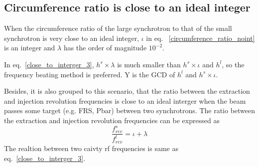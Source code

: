 \subsection{Circumference ratio is close to an ideal integer}
When the circumference ratio of the large synchrotron to that of the small synchrotron is very close to an ideal integer, $\iota$ in eq. ~\ref{circumference_ratio_noint} is an integer and $\lambda$ has the order of magnitude $10^{-2}$.


In eq.~\ref{close_to_interger_3}, $h^s\times\lambda $ is much smaller than $h^s \times \iota$ and $h^l$, so the frequency beating method is preferred. Y is the GCD of $h^l$ and $h^s \times \iota$.



Besides, it is also grouped to this scenario, that the ratio between the extraction and injection revolution frequencies is close to an ideal interger when the beam passes some target (e.g. FRS, Pbar) between two synchrotrons. The ratio between the extraction and injection revolution frequencies can be expressed as
\begin{equation} 
\frac{f_{rev}^{s}}{f_{rev}^{l}}=\iota+ \lambda\label{close_to_interger1}
\end{equation}
The realtion between two caivty rf frequencies is same as eq.~\ref{close_to_interger_3}.

